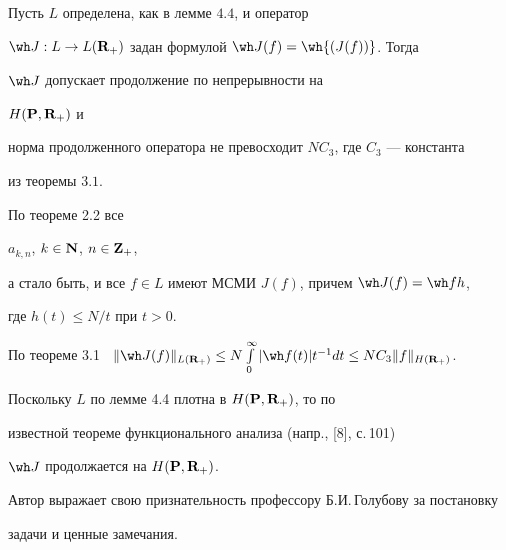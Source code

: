 \begin{thms}


Пусть $L$ определена, как в лемме $4.4$, и оператор 


${\wh J}:L\to L({\bold R}_+)$ задан формулой ${\wh J}(f)=\wh{(J(f))}$. Тогда 


${\wh J}$ допускает продолжение по непрерывности на


$H({\bold P},{\bold R}_+)$ и 


норма продолженного оператора не превосходит $NC_3$, где $C_3$ --- константа 


из теоремы $3.1$.


\end{thms}








\begin{pf}


По теореме 2.2 все


$a_{k,n}$, $k\in\bold N$, $n\in\bold Z_+$, 


а стало быть, и все $f\in L$ имеют МСМИ $J(f)$, причем ${\wh J}(f)={\wh f}h$, 


где $h(t)\leq N/t$ при $t>0$.


По теореме 3.1 \ $\|{\wh J}(f)\|_{L({\bold R}_+)}\leq


N\int\limits^{\infty}_0|{\wh f}(t)|t^{-1}dt\leq NC_3\|f\|_{H({\bold R}_+)}$. 


Поскольку $L$ по лемме 4.4 плотна в $H({\bold P},{\bold R}_+)$, то по 


известной теореме функционального анализа (напр., [8], с.\,101)


${\wh J}$ продолжается на $H({\bold P},{\bold R}_+)$.


\end{pf}





Автор выражает свою признательность профессору Б.И.\,Голубову за постановку 


задачи и ценные замечания.








